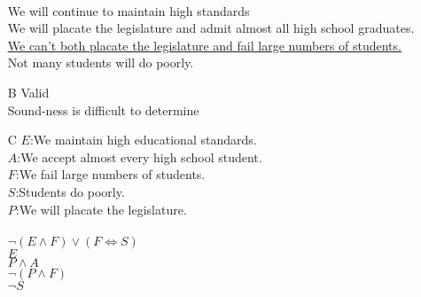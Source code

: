 \documentclass{article}
\begin{document}
\begin{enumerate}
			\\We will continue to maintain high standards
			\\We will placate the legislature and admit almost all high school graduates.
			\\\underline{We can't both placate the legislature and fail large numbers of students.}
			\\Not many students will do poorly.
		\item[B]
			Valid
			\\Sound-ness is difficult to determine
		\item[C]
			$E$:We maintain high educational standards.\\
			$A$:We accept almost every high school student.\\
			$F$:We fail large numbers of students.\\
			$S$:Students do poorly.\\
			$P$:We will placate the legislature.\\
			\\
			$\lnot(E \land F)\lor(F \iff S)$\\
			$E$\\
			$P \land A$\\
			\underline{$\lnot (P \land F)$}\\
			$\lnot S$
	\end{enumerate}
\end{document}
